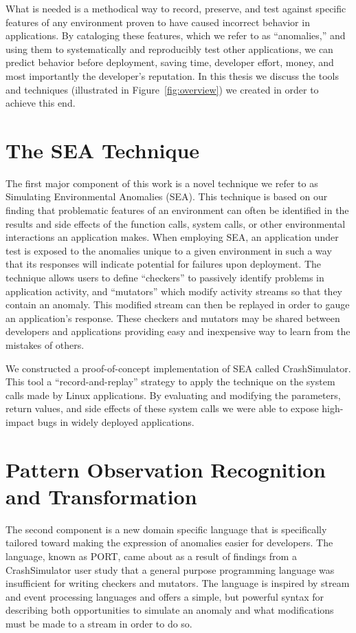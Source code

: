 What is needed is a methodical way to record, preserve, and test against
specific features of any environment proven to have caused incorrect
behavior in applications.
By cataloging these features,
which we refer to as ``anomalies,'' and using them to systematically and reproducibly test other applications, we can predict behavior before deployment, saving time, developer effort, money, and most importantly the developer's reputation.
In this thesis we discuss the tools and techniques (illustrated in Figure~\ref{fig:overview}) we created in order to achieve this end.

\section{The SEA Technique}
The first major component of this work is a novel technique we refer to as Simulating Environmental Anomalies (SEA).
This technique is based on our finding that problematic features of an environment can often be identified in the results and side effects of the function calls, system calls, or other environmental interactions an application makes. When employing SEA,
an application under test is exposed
to the anomalies unique to a given environment
in such a way that its responses will indicate
potential for failures upon deployment. 
The technique allows users to define ``checkers''
to passively identify problems in application activity,
and ``mutators'' which modify activity streams so that they contain an anomaly.
This modified stream can then be replayed
in order to gauge an application's response.
These checkers and mutators may be shared between developers and applications providing 
easy and inexpensive way to learn from the mistakes of others.

We constructed
a proof-of-concept implementation of SEA called CrashSimulator. This tool a ``record-and-replay'' strategy to apply the technique on the system calls made by Linux applications.
By evaluating and modifying the parameters, return values, and side effects of these system calls we were able to expose
high-impact bugs in widely deployed applications.

\section{Pattern Observation Recognition and Transformation}
The second component is a new domain specific language that is specifically tailored toward making the expression of anomalies easier for developers.
The language,
known as PORT,
came about as a result of findings from a CrashSimulator user study that a general purpose programming language was insufficient for writing checkers and mutators.
The language is inspired by stream and event processing languages and offers a simple,
but powerful syntax for describing both opportunities to simulate an anomaly and what modifications must be made to a stream in order to do so.

